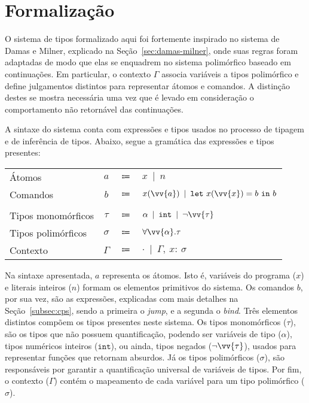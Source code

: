 \newcommand{\Mgu}{\ensuremath{\textit{mgu}}}
\newcommand{\MguList}{\ensuremath{\textit{mguList}}}
\newcommand{\UnifyVar}{\ensuremath{\textit{varBind}}}
\newcommand{\HeadSep}{\ensuremath{\textit{:}}}
\newcommand{\Length}{\ensuremath{\textit{length}}}
\newcommand{\List}{\ensuremath{\textit{list}}}

\section{Formalização}\label{sec:formalizacao}

O sistema de tipos formalizado aqui foi fortemente inspirado no sistema de Damas e Milner, explicado na Seção~\ref{sec:damas-milner}, onde suas regras foram adaptadas de modo que elas se enquadrem no sistema polimórfico baseado em continuações.
Em particular, o contexto $\Gamma$ associa variáveis a tipos polimórfico e define julgamentos distintos para representar átomos e comandos.
A distinção destes se mostra necessária uma vez que é levado em consideração o comportamento não retornável das continuações. 

A sintaxe do sistema conta com expressões e tipos usados no processo de tipagem e de inferência de tipos.
Abaixo, segue a gramática das expressões e tipos presentes:

\phantom{Newline}

\begin{tabular}{lccl}
  Átomos & $a$ & $\Coloneqq$ & $x \enspace|\enspace n$ \\
  Comandos & $b$ & $\Coloneqq$ & $x(\vv{a}) \enspace|\enspace \mathtt{let}\ x(\vv{x}) = b\ \mathtt{in}\ b$ \\
  \\
  Tipos monomórficos & $\tau$ & $\Coloneqq$ & $\alpha \enspace|\enspace \mathtt{int} \enspace|\enspace \neg\vv{\tau}$ \\
  Tipos polimórficos & $\sigma$ & $\Coloneqq$ & $\forall\vv{\alpha}.\tau$ \\
  Contexto & $\Gamma$ & $\Coloneqq$ & $\cdot \enspace|\enspace \Gamma,\ x{:}\ \sigma$ \\
\end{tabular}\label{cps-type-system}

\phantom{Newline}

\noindent Na sintaxe apresentada, $a$ representa os átomos. Isto é, variáveis do programa ($x$) e literais inteiros ($n$) formam os elementos primitivos do sistema.
Os comandos $b$, por sua vez, são as expressões, explicadas com mais detalhes na Seção~\ref{subsec:cps}, sendo a primeira o \textit{jump}, e a segunda o \textit{bind}.
Três elementos distintos compõem os tipos presentes neste sistema.
Os tipos monomórficos ($\tau$), são os tipos que não possuem quantificação, podendo ser variáveis de tipo ($\alpha$), tipos numéricos inteiros ($\mathtt{int}$), ou ainda, tipos negados ($\neg\vv{\tau}$), usados para representar funções que retornam absurdos.
Já os tipos polimórficos ($\sigma$), são responsáveis por garantir a quantificação universal de variáveis de tipos.
Por fim, o contexto ($\Gamma$) contém o mapeamento de cada variável para um tipo polimórfico ($\sigma$).

